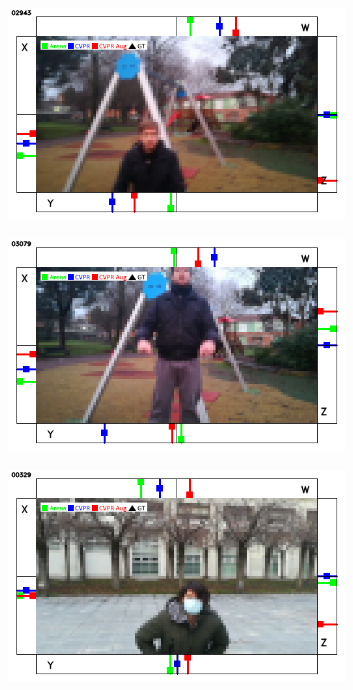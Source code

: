 \begin{figure}[H]
	\begin{center}
		\begin{subfigure}[h]{0.49\textwidth}
			\centering
			\includegraphics[width=0.98\textwidth]{"contents/images/qualitative-videos/jump1-park01-2943"}
		\end{subfigure}
		\hfill
		\begin{subfigure}[h]{0.49\textwidth}
			\centering
			\includegraphics[width=0.98\textwidth]{"contents/images/qualitative-videos/jump1-park01-3079"}
		\end{subfigure}
		\vfill
		\begin{subfigure}[h]{0.49\textwidth}
			\centering
			\includegraphics[width=0.98\textwidth]{"contents/images/qualitative-videos/jump2-square02-329"}

\end{subfigure}
\end{center}
\end{figure}

